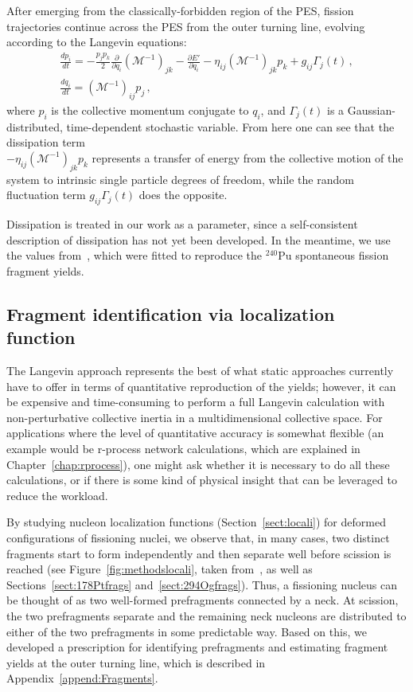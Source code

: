 After emerging from the classically-forbidden region of the PES, fission trajectories continue across the PES from the outer turning line, evolving according to the Langevin equations:
\begin{gather}\label{eq:langevin} 
	\frac{dp_i}{dt} =  
	-\frac{p_j p_k}{2} \frac{\partial}{\partial q_i}\left(\mathcal{M}^{-1}\right)_{jk} 
	- \frac{\partial E'}{\partial q_i}  - \eta_{ij}\left(\mathcal{M}^{-1}\right)_{jk} p_k + g_{ij}\Gamma_j(t) \,, \\ 
	\frac{dq_i}{dt} = 	\left(\mathcal{M}^{-1}\right)_{ij} p_j \,,  
\end{gather} 
\noindent where $p_i$ is the collective momentum conjugate to $q_i$, and $\Gamma_j(t)$ is a Gaussian-distributed, time-dependent stochastic variable. From here one can see that the dissipation term\\\noindent $- \eta_{ij}\left(\mathcal{M}^{-1}\right)_{jk} p_k$ represents a transfer of energy from the collective motion of the system to intrinsic single particle degrees of freedom, while the random fluctuation term $g_{ij}\Gamma_j(t)$ does the opposite.

Dissipation is treated in our work as a parameter, since a self-consistent description of dissipation has not yet been developed.  In the meantime, we use the values from~\cite{Sadhukhan2016}, which were fitted to reproduce the $^{240}$Pu spontaneous fission fragment yields.%

\subsection{Fragment identification via localization function}\label{sect:FragID}
The Langevin approach represents the best of what static approaches currently have to offer in terms of quantitative reproduction of the yields; however, it can be expensive and time-consuming to perform a full Langevin calculation with non-perturbative collective inertia in a multidimensional collective space. For applications where the level of quantitative accuracy is somewhat flexible (an example would be r-process network calculations, which are explained in Chapter~\ref{chap:rprocess}), one might ask whether it is necessary to do all these calculations, or if there is some kind of physical insight that can be leveraged to reduce the workload.

By studying nucleon localization functions (Section~\ref{sect:locali}) for deformed configurations of fissioning nuclei, we observe that, in many cases, two distinct fragments start to form independently and then separate well before scission is reached (see Figure~\ref{fig:methodslocali}, taken from~\cite{Zhang2016}, as well as Sections~\ref{sect:178Ptfrags} and~\ref{sect:294Ogfrags}). Thus, a fissioning nucleus can be thought of as two well-formed prefragments connected by a neck. At scission, the two prefragments separate and the remaining neck nucleons are distributed to either of the two prefragments in some predictable way. Based on this, we developed a prescription for identifying prefragments and estimating fragment yields at the outer turning line, which is described in Appendix~\ref{append:Fragments}.